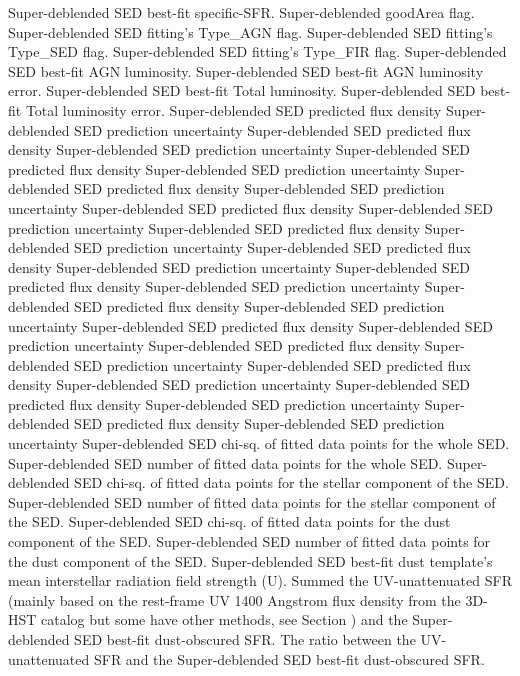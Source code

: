 Super-deblended SED best-fit specific-SFR.
Super-deblended goodArea flag.
Super-deblended SED fitting's Type_AGN flag.
Super-deblended SED fitting's Type_SED flag.
Super-deblended SED fitting's Type_FIR flag.
Super-deblended SED best-fit AGN luminosity.
Super-deblended SED best-fit AGN luminosity error.
Super-deblended SED best-fit Total luminosity.
Super-deblended SED best-fit Total luminosity error.
Super-deblended SED predicted flux density
Super-deblended SED prediction uncertainty
Super-deblended SED predicted flux density
Super-deblended SED prediction uncertainty
Super-deblended SED predicted flux density
Super-deblended SED prediction uncertainty
Super-deblended SED predicted flux density
Super-deblended SED prediction uncertainty
Super-deblended SED predicted flux density
Super-deblended SED prediction uncertainty
Super-deblended SED predicted flux density
Super-deblended SED prediction uncertainty
Super-deblended SED predicted flux density
Super-deblended SED prediction uncertainty
Super-deblended SED predicted flux density
Super-deblended SED prediction uncertainty
Super-deblended SED predicted flux density
Super-deblended SED prediction uncertainty
Super-deblended SED predicted flux density
Super-deblended SED prediction uncertainty
Super-deblended SED predicted flux density
Super-deblended SED prediction uncertainty
Super-deblended SED predicted flux density
Super-deblended SED prediction uncertainty
Super-deblended SED predicted flux density
Super-deblended SED prediction uncertainty
Super-deblended SED predicted flux density
Super-deblended SED prediction uncertainty
Super-deblended SED chi-sq. of fitted data points for the whole SED.
Super-deblended SED number of fitted data points for the whole SED.
Super-deblended SED chi-sq. of fitted data points for the stellar component of the SED.
Super-deblended SED number of fitted data points for the stellar component of the SED.
Super-deblended SED chi-sq. of fitted data points for the dust component of the SED.
Super-deblended SED number of fitted data points for the dust component of the SED.
Super-deblended SED best-fit dust template's mean interstellar radiation field strength (U).
Summed the UV-unattenuated SFR (mainly based on the rest-frame UV 1400 Angstrom flux density from the 3D-HST catalog but some have other methods, see Section ) and the Super-deblended SED best-fit dust-obscured SFR.
The ratio between the UV-unattenuated SFR and the Super-deblended SED best-fit dust-obscured SFR.